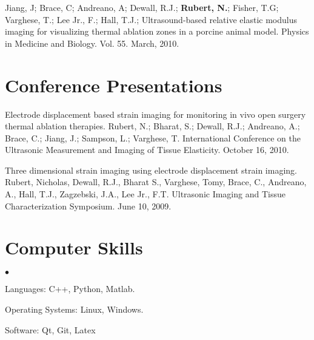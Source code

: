 \documentclass[margin,line]{res}
\newenvironment{list2}{
  \begin{list}{$\bullet$}{%
      \setlength{\itemsep}{0in}
      \setlength{\parsep}{0in} \setlength{\parskip}{0in}
      \setlength{\topsep}{0in} \setlength{\partopsep}{0in}
      \setlength{\leftmargin}{0.2in}}}{\end{list}}
\begin{document}
\begin{resume}
Jiang, J; Brace, C; Andreano, A; Dewall, R.J.; {\bf Rubert, N.}; Fisher, T.G; Varghese, T.; Lee Jr., F.; Hall, T.J.;  Ultrasound-based relative elastic modulus imaging for visualizing thermal ablation zones in a porcine animal model.  Physics in Medicine and Biology.  Vol. 55.  March, 2010.


\section{\sc Conference Presentations}

Electrode displacement based strain imaging for monitoring in vivo open surgery thermal ablation therapies.  Rubert, N.; Bharat, S.; Dewall, R.J.; Andreano, A.; Brace, C.; Jiang, J.; Sampson, L.; Varghese, T. International Conference on the Ultrasonic Measurement and Imaging of Tissue Elasticity.  October 16, 2010.

Three dimensional strain imaging using electrode displacement strain imaging.  Rubert, Nicholas, Dewall, R.J., Bharat S., Varghese, Tomy, Brace, C., Andreano, A., Hall, T.J., Zagzebski, J.A., Lee Jr., F.T.  Ultrasonic Imaging and Tissue Characterization Symposium.  June 10, 2009.




\section{\sc Computer Skills}
\begin{list2}
\item Languages: C++, Python, Matlab.
\item Operating Systems: Linux, Windows.\\
\item Software: Qt, Git, Latex   
\end{list2}
\vspace*{-.15in}

\end{resume}
\end{document}

